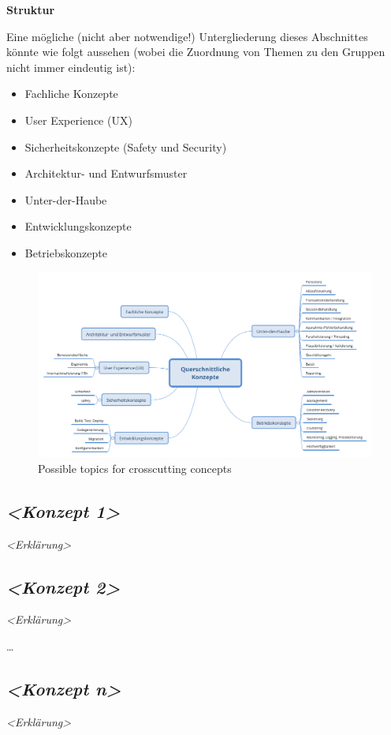 \textbf{Struktur}

Eine mögliche (nicht aber notwendige!) Untergliederung dieses
Abschnittes könnte wie folgt aussehen (wobei die Zuordnung von Themen zu
den Gruppen nicht immer eindeutig ist):

\begin{itemize}
\tightlist
\item
  Fachliche Konzepte
\item
  User Experience (UX)
\item
  Sicherheitskonzepte (Safety und Security)
\item
  Architektur- und Entwurfsmuster
\item
  Unter-der-Haube
\item
  Entwicklungskonzepte
\item
  Betriebskonzepte
\end{itemize}

\begin{figure}
\centering
\includegraphics{../images/08-Crosscutting-Concepts-Structure-DE.png}
\caption{Possible topics for crosscutting concepts}
\end{figure}

\hypertarget{konzept-1}{%
\subsection{\texorpdfstring{\emph{\textless Konzept
1\textgreater{}}}{\textless Konzept 1\textgreater{}}}\label{konzept-1}}

\emph{\textless Erklärung\textgreater{}}

\hypertarget{konzept-2}{%
\subsection{\texorpdfstring{\emph{\textless Konzept
2\textgreater{}}}{\textless Konzept 2\textgreater{}}}\label{konzept-2}}

\emph{\textless Erklärung\textgreater{}}

\ldots{}

\hypertarget{konzept-n}{%
\subsection{\texorpdfstring{\emph{\textless Konzept
n\textgreater{}}}{\textless Konzept n\textgreater{}}}\label{konzept-n}}

\emph{\textless Erklärung\textgreater{}}
